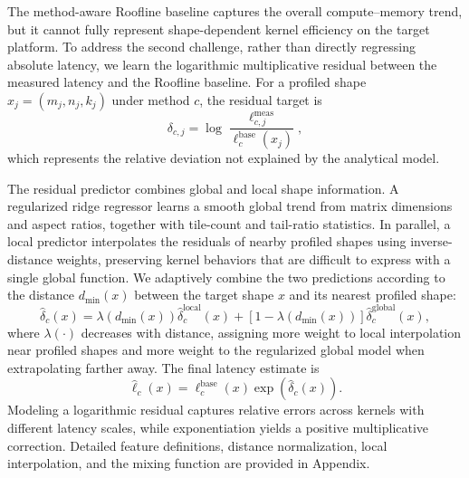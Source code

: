 \documentclass[letterpaper]{article} %
\begin{document}
The method-aware Roofline baseline captures the overall compute--memory trend, but it cannot fully represent shape-dependent kernel efficiency on the target platform. To address the second challenge, rather than directly regressing absolute latency, we learn the logarithmic multiplicative residual between the measured latency and the Roofline baseline. For a profiled shape $x_j=(m_j,n_j,k_j)$ under method $c$, the residual target is
\begin{equation}
\delta_{c,j}
=
\log
\frac{
\ell_{c,j}^{\mathrm{meas}}
}{
\ell_{c}^{\mathrm{base}}(x_j)
},
\end{equation}
which represents the relative deviation not explained by the analytical model.

The residual predictor combines global and local shape information. A regularized ridge regressor learns a smooth global trend from matrix dimensions and aspect ratios, together with tile-count and tail-ratio statistics. In parallel, a local predictor interpolates the residuals of nearby profiled shapes using inverse-distance weights, preserving kernel behaviors that are difficult to express with a single global function. We adaptively combine the two predictions according to the distance $d_{\min}(x)$ between the target shape $x$ and its nearest profiled shape:
\begin{equation}
\widehat{\delta}_c(x)
=
\lambda\!\left(d_{\min}(x)\right)
\widehat{\delta}_c^{\mathrm{local}}(x)
+
\left[1-\lambda\!\left(d_{\min}(x)\right)\right]
\widehat{\delta}_c^{\mathrm{global}}(x),
\end{equation}
where $\lambda(\cdot)$ decreases with distance, assigning more weight to local interpolation near profiled shapes and more weight to the regularized global model when extrapolating farther away. The final latency estimate is
\begin{equation}
\widehat{\ell}_{c}(x)
=
\ell_{c}^{\mathrm{base}}(x)
\exp\!\left(\widehat{\delta}_{c}(x)\right).
\end{equation}
Modeling a logarithmic residual captures relative errors across kernels with different latency scales, while exponentiation yields a positive multiplicative correction. Detailed feature definitions, distance normalization, local interpolation, and the mixing function are provided in Appendix.
\end{document}
